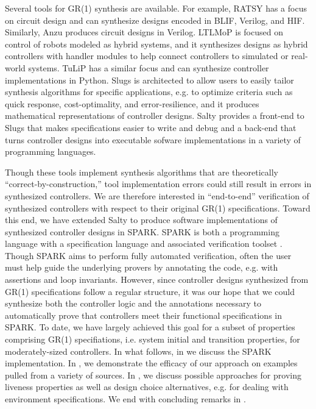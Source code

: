 \documentclass[runningheads]{llncs}
\begin{document}
Several tools for GR(1) synthesis are available. 
For example, RATSY %
\cite{bloem2010ratsy} has a focus on circuit design and can synthesize designs 
encoded in BLIF, %
Verilog, and HIF. %
Similarly, Anzu \cite{jobstmann2007anzu} produces circuit designs in Verilog.
LTLMoP 
\cite{finucane2010ltlmop} is focused on control of robots modeled as hybrid systems, 
and it synthesizes designs as hybrid controllers with handler modules to help connect controllers to simulated or real-world systems. 
TuLiP 
\cite{TuLiP2011} has a similar focus and can synthesize controller implementations in Python. 
Slugs 
\cite{Ehlers2016} is architected to allow users to easily tailor synthesis algorithms for specific applications,
 e.g. to optimize criteria such as quick response, cost-optimality, and error-resilience, and it produces mathematical representations of controller designs.
Salty \cite{elliott2019salty} provides a front-end to Slugs that makes specifications easier to write and debug and 
a back-end that turns controller designs into executable sofware implementations in a variety of programming languages.

Though these tools implement synthesis algorithms that are theoretically ``correct-by-construction,'' 
tool implementation errors could still result in errors in synthesized controllers. 
We are therefore interested in ``end-to-end'' verification of synthesized controllers with respect to their original GR(1) specifications. 
Toward this end, we have extended Salty to produce software implementations of synthesized controller designs in SPARK. 
SPARK is both a programming language with a specification language and associated verification toolset \cite{hoang2015spark}. 
Though SPARK aims to perform fully automated verification, often the user must help guide the underlying provers by
annotating the code, e.g. with assertions and loop invariants. 
However, since controller designs synthesized from GR(1) specifications follow a regular structure, it was our hope that we could 
synthesize both the controller logic and the annotations necessary to automatically prove that controllers meet their functional specifications in SPARK. 
To date, we have largely achieved this goal for a subset of properties comprising GR(1) specifiations, 
i.e. system initial and transition properties, for moderately-sized controllers.
In what follows, in  we discuss the SPARK implementation. 
In , we demonstrate the efficacy of our approach on examples pulled from a variety of sources.
In , we discuss possible approaches for proving liveness properties as well as design choice alternatives, 
e.g. for dealing with environment specifications.
We end with concluding remarks in .
\end{document}

